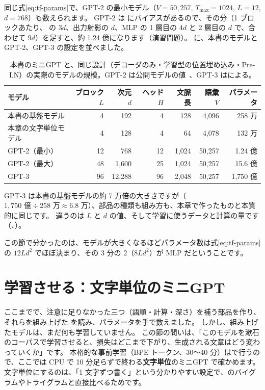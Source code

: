同じ式\eqref{eq:tf-params}で、GPT-2 の最小モデル（$V=50{,}257$, $T_{\max}=1024$, $L=12$, $d=768$）も数えられます。
GPT-2 は  にバイアスがあるので、その分（1 ブロックあたり、 の $3d$、出力射影の $d$、MLP の 1 層目の $4d$ と 2 層目の $d$ で、合わせて $9d$）を足すと、約 1.24 億になります（演習問題）。
に、本書のモデルと GPT-2、GPT-3 の設定を並べました。

\begin{table}[tbp]
\centering
\caption{本書のミニGPT と、同じ設計（デコーダのみ・学習型の位置埋め込み・Pre-LN）の実際のモデルの規模。GPT-2 は公開モデルの値~\cite{radford2019language}、GPT-3 は\cite{brown2020language}による。}
\label{tab:tf-scale}
\small
\begin{tabular}{lrrrrrr}
\toprule
モデル & ブロック $L$ & 次元 $d$ & ヘッド $H$ & 文脈長 & 語彙 $V$ & パラメータ \\
\midrule
本書の基盤モデル & 4 & 192 & 4 & 128 & 4,096 & 258 万 \\
本章の文字単位モデル & 4 & 128 & 4 & 64 & 4,078 & 132 万 \\
GPT-2（最小） & 12 & 768 & 12 & 1,024 & 50,257 & 1.24 億 \\
GPT-2（最大） & 48 & 1,600 & 25 & 1,024 & 50,257 & 15.6 億 \\
GPT-3 & 96 & 12,288 & 96 & 2,048 & 50,257 & 1,750 億 \\
\bottomrule
\end{tabular}
\end{table}

GPT-3 は本書の基盤モデルの約 7 万倍の大きさですが（$1{,}750\text{ 億}\div258\text{ 万}\approx6.8\text{ 万}$）、部品の種類も組み方も、本章で作ったものと本質的に同じです。
違うのは $L$ と $d$ の値、そして学習に使うデータと計算の量です（、）。

この節で分かったのは、モデルが大きくなるほどパラメータ数は式\eqref{eq:tf-params}の $12Ld^2$ でほぼ決まり、その 3 分の 2（$8Ld^2$）が MLP だということです。

\section{学習させる：文字単位のミニGPT}\label{sec:tf-train}

ここまでで、注意に足りなかった三つ（語順・計算・深さ）を補う部品を作り、それらを組み上げた  を読み、パラメータを手で数えました。
しかし、組み上げたモデルは、まだ何も学習していません。
この節の問いは、「このモデルを漱石のコーパスで学習させると、損失はどこまで下がり、生成される文章はどう変わっていくか」です。
本格的な事前学習（BPE トークン、30〜40 分）はで行うので、ここでは CPU で 10 分足らずで終わる\textbf{文字単位}のミニGPT で確かめます。
文字単位にするのは、「1 文字ずつ書く」という分かりやすい設定で、のバイグラムやトライグラムと直接比べるためです。

